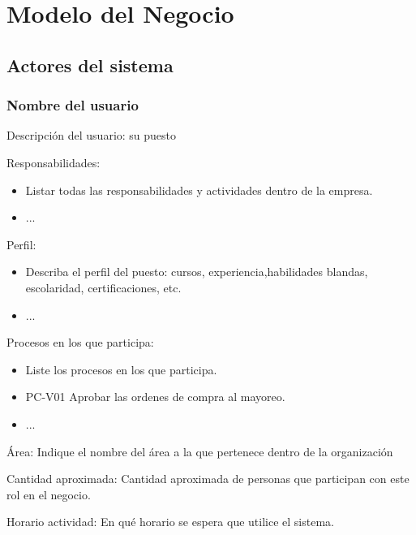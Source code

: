 
\chapter{Modelo del Negocio}	
\label{cap:reqSist}


\section{Actores del sistema}

	
	\begin{Usuario}{\hypertarget{A.NombreDelUsuario}{\subsection{Nombre del usuario}}}{
			Descripción del usuario: su puesto
		}
		\item[Responsabilidades:] \cdtEmpty
		\begin{itemize}
			\item Listar todas las responsabilidades y actividades dentro de la empresa.
			\item ...
		\end{itemize}
		
		\item[Perfil:] \cdtEmpty
		\begin{itemize}
			\item Describa el perfil del puesto: cursos, experiencia,habilidades blandas, escolaridad, certificaciones, etc.
			\item ...
		\end{itemize}
		\item[Procesos en los que participa:] \cdtEmpty
		\begin{itemize}
			\item Liste los procesos en los que participa.
			\item PC-V01 Aprobar las ordenes de compra al mayoreo.
			\item ...
		\end{itemize}
		\item[Área:] Indique el nombre del área a la que pertenece dentro de la organización
		\item[Cantidad aproximada:] Cantidad aproximada de personas que participan con este rol en el negocio.
		\item[Horario actividad:] En qué horario se espera que utilice el sistema. 
	\end{Usuario}
	
